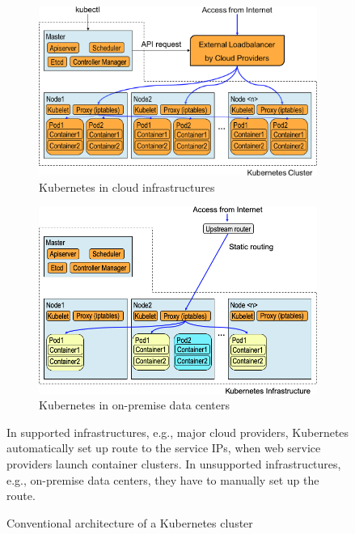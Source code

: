 \begin{figure}[tb]

  \begin{subfigure}[t]{\columnwidth}
    \centering
    \includegraphics[width=0.8\columnwidth]{Figs/K8sConventional}
    \caption{Kubernetes in cloud infrastructures}
    \label{fig:K8sConventional}
  \end{subfigure}

  \par\bigskip
  \par\bigskip

  \begin{subfigure}[t]{\columnwidth}
    \centering
    \includegraphics[width=0.8\columnwidth]{Figs/K8sConventional_bm}
    \caption{Kubernetes in on-premise data centers}
    \label{fig:K8sConventional_bm}
  \end{subfigure}

  \caption{Conventional architecture of a Kubernetes cluster}
  
  \centering
  \begin{minipage}{0.9\columnwidth}
    In supported infrastructures, e.g., major cloud providers, Kubernetes automatically set up route to the service IPs, when web service providers launch  container clusters.
    In unsupported infrastructures, e.g., on-premise data centers, they have to manually set up the route. 
  \end{minipage}

\end{figure}

